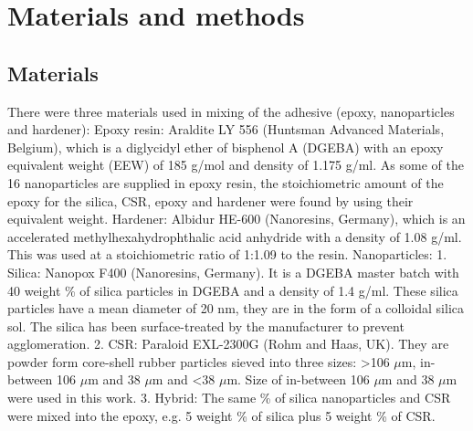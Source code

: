 \documentclass[numbers=noendperiod,chapterprefix=on]{icldt} %
\begin{document}
\section{Materials and methods}
\subsection{Materials}
There were three materials used in mixing of the adhesive (epoxy, nanoparticles and hardener):
Epoxy resin: Araldite LY 556 (Huntsman Advanced Materials, Belgium), which is a diglycidyl ether of bisphenol A (DGEBA) with an epoxy equivalent weight (EEW) of 185 g/mol and density of 1.175 g/ml. As some of the
16
nanoparticles are supplied in epoxy resin, the stoichiometric amount of the epoxy for the silica, CSR, epoxy and hardener were found by using their equivalent weight.
Hardener: Albidur HE-600 (Nanoresins, Germany), which is an accelerated methylhexahydrophthalic acid anhydride with a density of 1.08 g/ml. This was used at a stoichiometric ratio of 1:1.09 to the resin.
Nanoparticles:
1. Silica: Nanopox F400 (Nanoresins, Germany). It is a DGEBA master batch with 40 weight \% of silica particles in DGEBA and a density of 1.4 g/ml. These silica particles have a mean diameter of 20 nm, they are in the form of a colloidal silica sol. The silica has been surface-treated by the manufacturer to prevent agglomeration.
2. CSR: Paraloid EXL-2300G (Rohm and Haas, UK). They are powder form core-shell rubber particles sieved into three sizes: >106 $\mu$m, in-between 106 $\mu$m and 38 $\mu$m and <38 $\mu$m. Size of in-between 106 $\mu$m and 38 $\mu$m were used in this work.
3. Hybrid: The same \% of silica nanoparticles and CSR were mixed into the epoxy, e.g. 5 weight \% of silica plus 5 weight \% of CSR.
\end{document}

